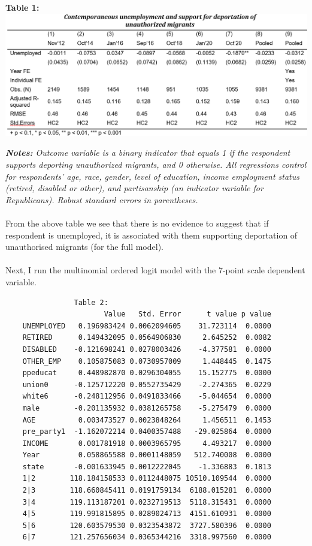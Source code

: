 \documentclass[12pt,letterpaper]{article}
\begin{document}
\begin{center}
	\textbf{Table 1:}
	\includegraphics[scale=0.9]{Table 1.png}
\end{center}
\textit{\textbf{Notes:} Outcome variable is a binary indicator that equals 1 if the respondent supports deporting unauthorized migrants, and 0 otherwise. All regressions control for respondents’ age, race, gender, level of education, income employment status (retired, disabled or other), and partisanship (an indicator variable for Republicans). Robust standard errors in parentheses.}\\
\\From the above table we see that there is no evidence to suggest that if respondent is unemployed, it is associated with them supporting deportation of unauthorised migrants (for the full model).\\
\\Next, I run the multinomial ordered logit model with the 7-point scale dependent variable.
  
\begin{Verbatim}
				Table 2:
	                   Value   Std. Error      t value p value
	UNEMPLOYED   0.196983424 0.0062094605    31.723114  0.0000
	RETIRED      0.149432095 0.0564906830     2.645252  0.0082
	DISABLED    -0.121698241 0.0278003426    -4.377581  0.0000
	OTHER_EMP    0.105875083 0.0730957009     1.448445  0.1475
	ppeducat     0.448982870 0.0296304055    15.152775  0.0000
	union0      -0.125712220 0.0552735429    -2.274365  0.0229
	white6      -0.248112956 0.0491833466    -5.044654  0.0000
	male        -0.201135932 0.0381265758    -5.275479  0.0000
	AGE          0.003473527 0.0023848264     1.456511  0.1453
	pre_party1  -1.162072214 0.0400357488   -29.025864  0.0000
	INCOME       0.001781918 0.0003965795     4.493217  0.0000
	Year         0.058865588 0.0001148059   512.740008  0.0000
	state       -0.001633945 0.0012222045    -1.336883  0.1813
	1|2        118.184158533 0.0112448075 10510.109544  0.0000
	2|3        118.660845411 0.0191759134  6188.015281  0.0000
	3|4        119.113187201 0.0232719513  5118.315431  0.0000
	4|5        119.991815895 0.0289024713  4151.610931  0.0000
	5|6        120.603579530 0.0323543872  3727.580396  0.0000
	6|7        121.257656034 0.0365344216  3318.997560  0.0000
\end{Verbatim}
\end{document}
